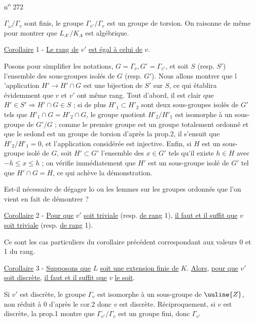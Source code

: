 n\textsuperscript{o} 272

$\Gamma_\omega/\Gamma_v$ sont finis, le groupe $\Gamma_{v'}/\Gamma_v$ est un groupe de torsion. On raisonne de même pour montrer que $L_{A'}/K_A$ est algébrique.

\uline{Corollaire} 1 - \uline{Le rang de} $v'$ \uline{est égal à celui de} $v$.

Posons pour simplifier les notations, $G=\Gamma_v,G'=\Gamma_{v'}$, et soit $S$ (resp. $S'$) l'ensemble des sous-groupes isolés de $G$ (resp. $G'$). Nous allons montrer que l 'application $H'\longrightarrow H'\cap G$ est une bijection de $S'$ sur $S$, ce qui établira évidemment que $v$ et $v'$ ont même rang. Tout d'abord, il est clair que $H'\in S'\Rightarrow H'\cap G\in S$ ; si de plus $H'_1\subset H'_2$ sont deux sous-groupes isolés de $G'$ tels que $H'_1\cap G=H'_2\cap G$, le groupe quotient $H'_2/H'_1$ est isomorphe à un sous-groupe de $G'/G$ ; comme le premier groupe est un groupe totalement ordonné et que le sedond est un groupe de torsion d'après la prop.2, il s'ensuit que $H'_2/H'_1=0$, et l'application considérée est injective. Enfin, si $H$ est un sous-groupe isolé de $G$, soit $H'\subset G'$ l'ensemble des $x\in G'$ tels qu'il existe $h\in H$ avec $-h\leq x\leq h$ ; on vérifie immédiatement que $H'$ est un sous-groupe isolé de $G'$ tel que $H'\cap G=H$, ce qui achève la démonstration.

\handwritten{[}Est-il nécessaire de dégager lo ou les lemmes sur les groupes ordonnés que l'on vient en fait de démontrer ?\handwritten{]}

\uline{Corollaire} 2 - \uline{Pour que} $v'$ \uline{soit triviale} (resp. \uline{de rang} 1), \uline{il faut et il suffit que} $v$ \uline{soit triviale} (resp. \uline{de rang} 1).

Ce sont les cas particuliers du corollaire précédent correspondant aux valeurs 0 et 1 du rang.

\uline{Corollaire} 3 - \uline{Supposons que} $L$ \uline{soit une extension finie de} $K$. \uline{Alors}, \uline{pour que} $v'$ \uline{soit discrète}, \uline{il faut et il suffit que} $v$ \uline{le soit}.

Si $v'$ est discrète, le groupe $\Gamma_v$ est isomorphe à un sous-groupe de $\uuline{Z}$, non réduit à $0$ d'après le cor.2 donc $v$ est discrète. Réciproquement, si $v$ est discrète, la prop.1 montre que $\Gamma_{v'}/\Gamma_v$ est un groupe fini, donc $\Gamma_{v'}$
